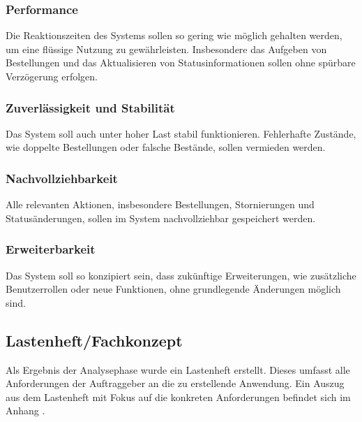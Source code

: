 \subsubsection{Performance}
Die Reaktionszeiten des Systems sollen so gering wie möglich gehalten werden, um eine flüssige Nutzung zu gewährleisten. Insbesondere das Aufgeben
von Bestellungen und das Aktualisieren von Statusinformationen sollen ohne spürbare Verzögerung erfolgen.

\subsubsection{Zuverlässigkeit und Stabilität}
Das System soll auch unter hoher Last stabil funktionieren. Fehlerhafte Zustände, wie doppelte Bestellungen oder falsche Bestände, sollen vermieden werden.

\subsubsection{Nachvollziehbarkeit}
Alle relevanten Aktionen, insbesondere Bestellungen, Stornierungen und Statusänderungen, sollen im System nachvollziehbar gespeichert werden.

\subsubsection{Erweiterbarkeit}
Das System soll so konzipiert sein, dass zukünftige Erweiterungen, wie zusätzliche Benutzerrollen oder neue Funktionen, ohne grundlegende Änderungen möglich sind.

\subsection{Lastenheft/Fachkonzept}
\label{sec:Lastenheft}
Als Ergebnis der Analysephase wurde ein Lastenheft erstellt. Dieses umfasst alle Anforderungen der Auftraggeber an die zu erstellende Anwendung.
Ein Auszug aus dem Lastenheft mit Fokus auf die konkreten Anforderungen befindet sich im Anhang .